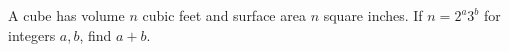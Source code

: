 A cube has volume $n$ cubic feet and surface area $n$ square inches. If $n=2^a3^b$ for integers $a,b$, find $a+b$.
